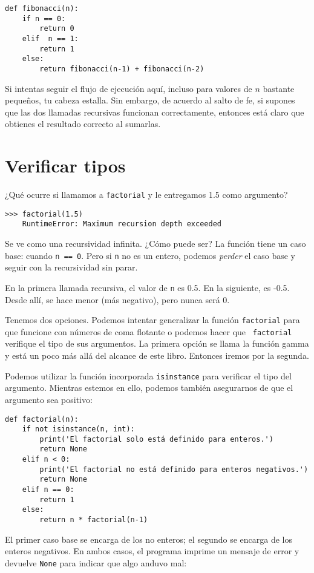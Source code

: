 \documentclass[10pt]{book}
\begin{document}
\begin{verbatim}
def fibonacci(n):
    if n == 0:
        return 0
    elif  n == 1:
        return 1
    else:
        return fibonacci(n-1) + fibonacci(n-2)
\end{verbatim}
%
Si intentas seguir el flujo de ejecución aquí, incluso para valores
de $n$ bastante pequeños, tu cabeza estalla.  Sin embargo, de acuerdo al
salto de fe, si supones que las dos llamadas recursivas
funcionan correctamente, entonces está claro que obtienes
el resultado correcto al sumarlas.


\section{Verificar tipos}
\label{guardian}

¿Qué ocurre si llamamos a {\tt factorial} y le entregamos 1.5 como argumento?

\begin{verbatim}
>>> factorial(1.5)
    RuntimeError: Maximum recursion depth exceeded
\end{verbatim}
%
Se ve como una recursividad infinita.  ¿Cómo puede ser?  La función
tiene un caso base: cuando {\tt n == 0}.  Pero si {\tt n} no es un entero,
podemos {\em perder} el caso base y seguir con la recursividad sin parar.

En la primera llamada recursiva, el valor de {\tt n} es 0.5.
En la siguiente, es -0.5.  Desde allí, se hace menor
(más negativo), pero nunca será 0.

Tenemos dos opciones.  Podemos intentar generalizar la función {\tt factorial}
para que funcione con números de coma flotante o podemos hacer que {\tt
  factorial} verifique el tipo de sus argumentos.  La primera opción se
llama la función gamma y está
un poco más allá del alcance de este libro.  Entonces iremos por la segunda.

Podemos utilizar la función incorporada {\tt isinstance} para verificar el tipo
del argumento.  Mientras estemos en ello, podemos también asegurarnos de que el
argumento sea positivo:

\begin{verbatim}
def factorial(n):
    if not isinstance(n, int):
        print('El factorial solo está definido para enteros.')
        return None
    elif n < 0:
        print('El factorial no está definido para enteros negativos.')
        return None
    elif n == 0:
        return 1
    else:
        return n * factorial(n-1)
\end{verbatim}
%
El primer caso base se encarga de los no enteros; el
segundo se  encarga de los enteros negativos.  En ambos casos, el programa imprime
un mensaje de error y devuelve {\tt None} para indicar que algo
anduvo mal:
\end{document}
